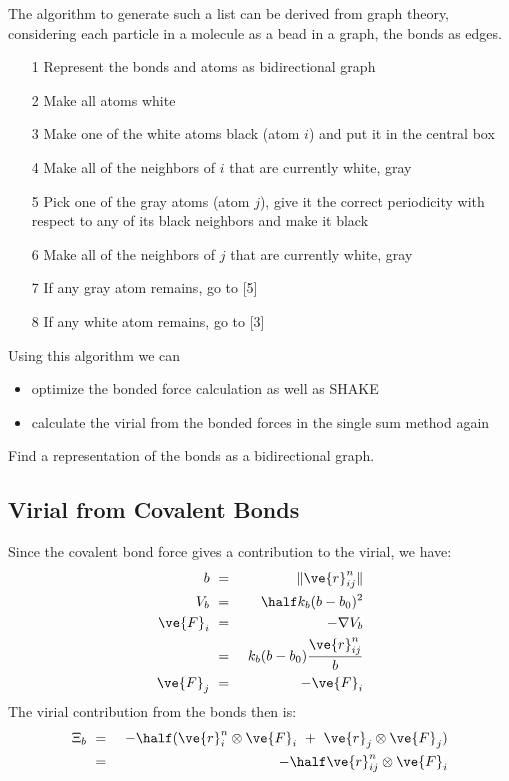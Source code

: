 The algorithm to generate such a list can be derived from graph theory,
considering each particle in a molecule as a bead in a graph, the bonds 
as edges.
\begin{enumerate}
\item[1]	Represent the bonds and atoms as bidirectional graph
\item[2]	Make all atoms white
\item[3]	Make one of the white atoms black (atom $i$) and put it in the
		central box
\item[4]	Make all of the neighbors of $i$ that are currently 
		white, gray 
\item[5]	Pick one of the gray atoms (atom $j$), give it the
		correct periodicity with respect to any of 
		its black neighbors
		and make it black
\item[6]	Make all of the neighbors of $j$ that are currently 
		white, gray
\item[7]	If any gray atom remains, go to [5]
\item[8]	If any white atom remains, go to [3]
\end{enumerate}
Using this algorithm we can 
\begin{itemize}
\item	optimize the bonded force calculation as well as SHAKE 
\item	calculate the virial from the bonded forces
	in the single sum method again
\end{itemize}

Find a representation of the bonds as a bidirectional graph.

\subsection{Virial from Covalent Bonds}
Since the covalent bond force gives a contribution to the virial, we have:
\begin{eqnarray}
b	&~=~&	\|\ve{r}_{ij}^n\|					\\
V_b	&~=~&	\half k_b(b-b_0)^2				\\
\ve{F}_i	&~=~&	-\nabla V_b					\\
	&~=~&	k_b(b-b_0)\frac{\ve{r}_{ij}^n}{b}			\\
\ve{F}_j	&~=~&	-\ve{F}_i
\end{eqnarray}
The virial contribution from the bonds then is:
\begin{eqnarray}
\Xi_b	&~=~&	-\half(\ve{r}_i^n\otimes\ve{F}_i~+~\ve{r}_j\otimes\ve{F}_j)	\\
	&~=~&	-\half\ve{r}_{ij}^n\otimes\ve{F}_i
\end{eqnarray}

